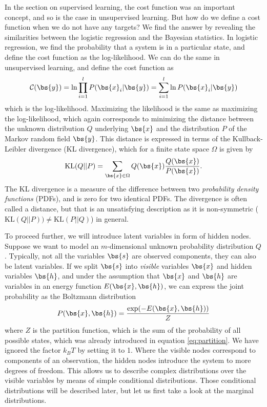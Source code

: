 In the section on supervised learning, the cost function was an important concept, and so is the case in unsupervised learning. But how do we define a cost function when we do not have any targets? We find the answer by revealing the similarities between the logistic regression and the Bayesian statistics. In logistic regression, we find the probability that a system is in a particular state, and define the cost function as the log-likelihood. We can do the same in unsupervised learning, and define the cost function as
\begin{equation}
\mathcal{C}(\bs{y})=\ln\prod_{i=1}^lP(\bs{x}_i|\bs{y})=\sum_{i=1}^l\ln P(\bs{x}_i|\bs{y})
\end{equation}
which is the log-likelihood. Maximizing the likelihood is the same as maximizing the log-likelihood, which again corresponds to minimizing the distance between the unknown distribution $Q$ underlying $\bs{x}$ and the distribution $P$ of the Markov random field $\bs{y}$. This distance is expressed in terms of the Kullback-Leibler divergence (KL divergence), which for a finite state space $\Omega$ is given by
\begin{equation}
\text{KL}(Q||P)=\sum_{\bs{x}\in\Omega}Q(\bs{x})\frac{Q(\bs{x})}{P(\bs{x})}.
\end{equation}
The KL divergence is a measure of the difference between two \textit{probability density functions} (PDFs), and is zero for two identical PDFs. The divergence is often called a distance, but that is an unsatisfying description as it is non-symmetric ($\text{KL}(Q||P))\neq\text{KL}(P||Q)$) in general. 

To proceed further, we will introduce latent variables in form of hidden nodes. Suppose we want to model an $m$-dimensional unknown probability distribution $Q$. Typically, not all the variables $\bs{s}$ are observed components, they can also be latent variables. If we split $\bs{s}$ into \textit{visible} variables $\bs{x}$ and hidden variables $\bs{h}$, and under the assumption that $\bs{x}$ and $\bs{h}$ are variables in an energy function $E(\bs{x},\bs{h})$, we can express the joint probability as the Boltzmann distribution
\begin{equation}
P(\bs{x},\bs{h})=\frac{\exp(-E(\bs{x},\bs{h}))}{Z}
\end{equation}
where $Z$ is the partition function, which is the sum of the probability of all possible states, which was already introduced in equation \eqref{eq:partition}. We have ignored the factor $k_BT$ by setting it to 1. Where the visible nodes correspond to components of an observation, the hidden nodes introduce the system to more degrees of freedom. This allows us to describe complex distributions over the visible variables by means of simple conditional distributions. \cite{fischer_training_2014} Those conditional distributions will be described later, but let us first take a look at the marginal distributions.

